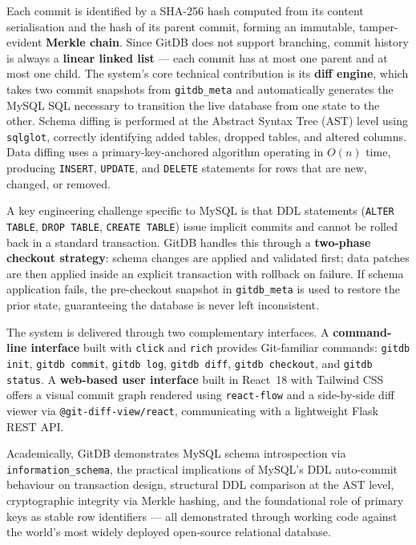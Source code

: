 \documentclass[12pt, a4paper]{article}
\begin{document}
\begin{onehalfspacing}
Each commit is identified by a SHA-256 hash computed from its content
serialisation and the hash of its parent commit, forming an immutable,
tamper-evident \textbf{Merkle chain}. Since GitDB does not support branching,
commit history is always a \textbf{linear linked list} --- each commit has at
most one parent and at most one child. The system's core technical contribution
is its \textbf{diff engine}, which takes two commit snapshots from
\texttt{gitdb\_meta} and automatically generates the MySQL SQL necessary to
transition the live database from one state to the other. Schema diffing is
performed at the Abstract Syntax Tree (AST) level using \texttt{sqlglot},
correctly identifying added tables, dropped tables, and altered columns. Data
diffing uses a primary-key-anchored algorithm operating in $O(n)$ time,
producing \texttt{INSERT}, \texttt{UPDATE}, and \texttt{DELETE} statements for
rows that are new, changed, or removed.

A key engineering challenge specific to MySQL is that DDL statements
(\texttt{ALTER TABLE}, \texttt{DROP TABLE}, \texttt{CREATE TABLE}) issue implicit
commits and cannot be rolled back in a standard transaction. GitDB handles this
through a \textbf{two-phase checkout strategy}: schema changes are applied and
validated first; data patches are then applied inside an explicit transaction
with rollback on failure. If schema application fails, the pre-checkout snapshot
in \texttt{gitdb\_meta} is used to restore the prior state, guaranteeing the
database is never left inconsistent.

The system is delivered through two complementary interfaces. A
\textbf{command-line interface} built with \texttt{click} and \texttt{rich}
provides Git-familiar commands: \texttt{gitdb init}, \texttt{gitdb commit},
\texttt{gitdb log}, \texttt{gitdb diff}, \texttt{gitdb checkout}, and
\texttt{gitdb status}. A \textbf{web-based user interface} built in React~18
with Tailwind CSS offers a visual commit graph rendered using \texttt{react-flow}
and a side-by-side diff viewer via \texttt{@git-diff-view/react}, communicating
with a lightweight Flask REST API.

Academically, GitDB demonstrates MySQL schema introspection via
\texttt{information\_schema}, the practical implications of MySQL's DDL
auto-commit behaviour on transaction design, structural DDL comparison at the
AST level, cryptographic integrity via Merkle hashing, and the foundational role
of primary keys as stable row identifiers --- all demonstrated through working
code against the world's most widely deployed open-source relational database.

\end{onehalfspacing}
\end{document}
